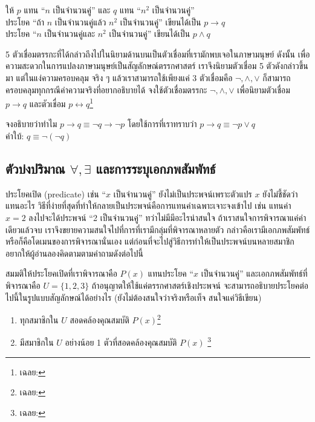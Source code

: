 \begin{exam}
	ให้ $p$ แทน “$n$ เป็นจำนวนคู่” และ $q$ แทน “$n^2$ เป็นจำนวนคู่”\\
	ประโยค “ถ้า $n$ เป็นจำนวนคู่แล้ว $n^2$ เป็นจำนวนคู่” เขียนได้เป็น $p\to q$ \\
	ประโยค “$n$ เป็นจำนวนคู่และ $n^2$ เป็นจำนวนคู่” เขียนได้เป็น $p\land q$
\end{exam}

\begin{exer}
	5 ตัวเชื่อมตรรกะที่ได้กล่าวถึงไปในนิยามด้านบนเป็นตัวเชื่อมที่เรามักพบเจอในภาษามนุษย์ ดังนั้น เพื่อความสะดวกในการแปลงภาษามนุษย์เป็นสัญลักษณ์ตรรกศาสตร์ เราจึงนิยามตัวเชื่อม 5 ตัวดังกล่าวขึ้นมา แต่ในแง่ความครอบคลุม จริง ๆ แล้วเราสามารถใช้เพียงแค่ 3 ตัวเชื่อมคือ $\neg, \wedge, \vee$ ก็สามารถครอบคลุมทุกกรณีค่าความจริงที่อยากอธิบายได้ จงใช้ตัวเชื่อมตรรกะ $\neg, \wedge, \vee$ เพื่อนิยามตัวเชื่อม $p\to q$ และตัวเชื่อม $p\leftrightarrow q$\footnote{เฉลย: }
\end{exer}

\begin{exer}
	จงอธิบายว่าทำไม $p\to q \equiv \neg q \to \neg p$ โดยใช้การที่เราทราบว่า $p\to q \equiv \neg p \vee q$\\
	คำใบ้: $q \equiv \neg(\neg q)$
\end{exer}


\subsection{ตัวบ่งปริมาณ $\forall,\exists$ และการระบุเอกภพสัมพัทธ์}
ประโยคเปิด (predicate) เช่น “$x$ เป็นจำนวนคู่” ยังไม่เป็นประพจน์เพราะตัวแปร $x$ ยังไม่ชี้ชัดว่าแทนอะไร วิธีที่ง่ายที่สุดที่ทำให้กลายเป็นประพจน์คือการแทนค่าเฉพาะเจาะจงเข้าไป เช่น แทนค่า $x = 2$ ลงไปจะได้ประพจน์ “2 เป็นจำนวนคู่” ทว่าไม่มีมีอะไรน่าสนใจ ถ้าเราสนใจการพิจารณาแค่ค่าเดียวแล้วจบ เราจึงขยายความสนใจไปที่การที่เรามีกลุ่มที่พิจารณาหลายตัว กล่าวคือเรามีเอกภพสัมพัทธ์ หรือก็คือโดเมนของการพิจารณานั่นเอง  แต่ก่อนที่จะไปสู่วิธีการทำให้เป็นประพจน์บนหลายสมาชิก อยากให้ผู้อ่านลองคิดตามตามคำถามดังต่อไปนี้

\begin{exer}\label{beforeQuantify}
	สมมติให้ประโยคเปิดที่เราพิจารณาคือ $P(x)$ แทนประโยค “$x$ เป็นจำนวนคู่” และเอกภพสัมพัทธ์ที่พิจารณาคือ $U = \{1,2,3\}$
	ถ้าอนุญาตให้ใช้แค่ตรรกศาสตร์เชิงประพจน์ จะสามารถอธิบายประโยคต่อไปนี้ในรูปแบบสัญลักษณ์ได้อย่างไร (ยังไม่ต้องสนใจว่าจริงหรือเท็จ สนใจแค่วิธีเขียน)
	\begin{enumerate}
		\item ทุกสมาชิกใน $U$ สอดคล้องคุณสมบัติ $P(x)$\footnote{เฉลย: }
		\item มีสมาชิกใน $U$ อย่างน้อย 1 ตัวที่สอดคล้องคุณสมบัติ $P(x)$ \footnote{เฉลย: }
	\end{enumerate}
\end{exer}

